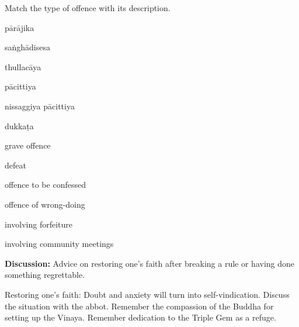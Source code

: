 \begin{exam}{\autoExamName}
\begin{problem}
\end{problem}

\problemDivide

\begin{problem*}

  Match the type of offence with its description.

  \bigskip

  \begin{multicols}{2}

    \begin{parts}

    \item \fillin{2cm}{\ref{parajika}} pārājika
    \item \fillin{2cm}{\ref{sanghadisesa}} saṅghādisesa
    \item \fillin{2cm}{\ref{thullacaya}} thullacāya
    \item \fillin{2cm}{\ref{pacittiya}} pācittiya
    \item \fillin{2cm}{\ref{nissaggiya}} nissaggiya pācittiya
    \item \fillin{2cm}{\ref{dukkata}} dukkaṭa

    \columnbreak

    \bMatchChoices

    \item\label{thullacaya} grave offence
    \item\label{parajika} defeat
    \item\label{pacittiya} offence to be confessed
    \item\label{dukkata} offence of wrong-doing
    \item\label{nissaggiya} involving forfeiture
    \item\label{sanghadisesa} involving community meetings

    \eMatchChoices
      
    \end{parts}
    
  \end{multicols}

  \bigskip

  \textbf{Discussion:} Advice on restoring one's faith after breaking a rule or
  having done something regrettable.

  \begin{solution}
    Restoring one's faith: Doubt and anxiety will turn into self-vindication.
    Discuss the situation with the abbot. Remember the compassion of the Buddha
    for setting up the Vinaya. Remember dedication to the Triple Gem as a
    refuge.
  \end{solution}


\end{problem*}
\end{exam}
